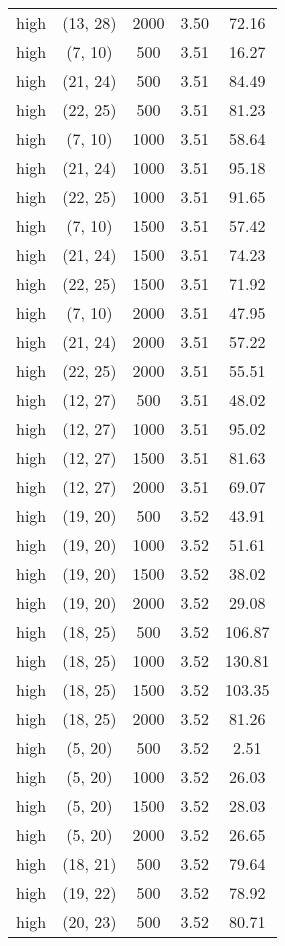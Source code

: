 \begin{tabular}{c c c c c}
high & (13, 28) &  2000 & 3.50 & 72.16 \\
high & (7, 10) &  500 & 3.51 & 16.27 \\
high & (21, 24) &  500 & 3.51 & 84.49 \\
high & (22, 25) &  500 & 3.51 & 81.23 \\
high & (7, 10) &  1000 & 3.51 & 58.64 \\
high & (21, 24) &  1000 & 3.51 & 95.18 \\
high & (22, 25) &  1000 & 3.51 & 91.65 \\
high & (7, 10) &  1500 & 3.51 & 57.42 \\
high & (21, 24) &  1500 & 3.51 & 74.23 \\
high & (22, 25) &  1500 & 3.51 & 71.92 \\
high & (7, 10) &  2000 & 3.51 & 47.95 \\
high & (21, 24) &  2000 & 3.51 & 57.22 \\
high & (22, 25) &  2000 & 3.51 & 55.51 \\
high & (12, 27) &  500 & 3.51 & 48.02 \\
high & (12, 27) &  1000 & 3.51 & 95.02 \\
high & (12, 27) &  1500 & 3.51 & 81.63 \\
high & (12, 27) &  2000 & 3.51 & 69.07 \\
high & (19, 20) &  500 & 3.52 & 43.91 \\
high & (19, 20) &  1000 & 3.52 & 51.61 \\
high & (19, 20) &  1500 & 3.52 & 38.02 \\
high & (19, 20) &  2000 & 3.52 & 29.08 \\
high & (18, 25) &  500 & 3.52 & 106.87 \\
high & (18, 25) &  1000 & 3.52 & 130.81 \\
high & (18, 25) &  1500 & 3.52 & 103.35 \\
high & (18, 25) &  2000 & 3.52 & 81.26 \\
high & (5, 20) &  500 & 3.52 & 2.51 \\
high & (5, 20) &  1000 & 3.52 & 26.03 \\
high & (5, 20) &  1500 & 3.52 & 28.03 \\
high & (5, 20) &  2000 & 3.52 & 26.65 \\
high & (18, 21) &  500 & 3.52 & 79.64 \\
high & (19, 22) &  500 & 3.52 & 78.92 \\
high & (20, 23) &  500 & 3.52 & 80.71 \\

\end{tabular}
